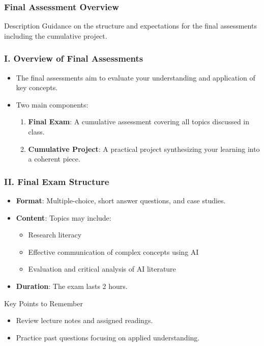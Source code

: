 \documentclass{beamer}
\begin{document}
\begin{frame}[fragile]
    \frametitle{Final Assessment Overview}
    \begin{block}{Description}
        Guidance on the structure and expectations for the final assessments including the cumulative project.
    \end{block}
\end{frame}

\begin{frame}[fragile]
    \frametitle{I. Overview of Final Assessments}
    \begin{itemize}
        \item The final assessments aim to evaluate your understanding and application of key concepts.
        \item Two main components:
        \begin{enumerate}
            \item \textbf{Final Exam}: A cumulative assessment covering all topics discussed in class.
            \item \textbf{Cumulative Project}: A practical project synthesizing your learning into a coherent piece.
        \end{enumerate}
    \end{itemize}
\end{frame}

\begin{frame}[fragile]
    \frametitle{II. Final Exam Structure}
    \begin{itemize}
        \item \textbf{Format}: Multiple-choice, short answer questions, and case studies.
        \item \textbf{Content}: Topics may include:
        \begin{itemize}
            \item Research literacy
            \item Effective communication of complex concepts using AI
            \item Evaluation and critical analysis of AI literature
        \end{itemize}
        \item \textbf{Duration}: The exam lasts 2 hours.
    \end{itemize}

    \begin{block}{Key Points to Remember}
        \begin{itemize}
            \item Review lecture notes and assigned readings.
            \item Practice past questions focusing on applied understanding.
        \end{itemize}
    \end{block}
\end{frame}
\end{document}
